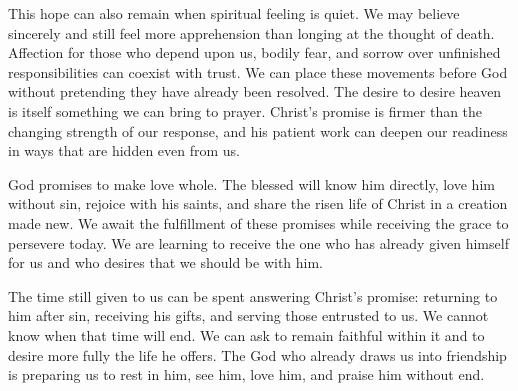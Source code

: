 This hope can also remain when spiritual feeling is quiet. We may believe sincerely and still feel more apprehension than longing at the thought of death. Affection for those who depend upon us, bodily fear, and sorrow over unfinished responsibilities can coexist with trust. We can place these movements before God without pretending they have already been resolved. The desire to desire heaven is itself something we can bring to prayer. Christ's promise is firmer than the changing strength of our response, and his patient work can deepen our readiness in ways that are hidden even from us.

God promises to make love whole. The blessed will know him directly, love him without sin, rejoice with his saints, and share the risen life of Christ in a creation made new. We await the fulfillment of these promises while receiving the grace to persevere today. We are learning to receive the one who has already given himself for us and who desires that we should be with him.

The time still given to us can be spent answering Christ's promise: returning to him after sin, receiving his gifts, and serving those entrusted to us. We cannot know when that time will end. We can ask to remain faithful within it and to desire more fully the life he offers. The God who already draws us into friendship is preparing us to rest in him, see him, love him, and praise him without end.

